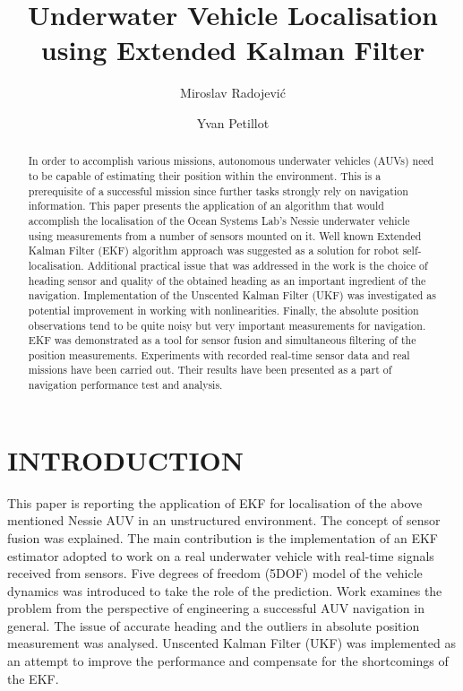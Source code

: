 \documentclass[a4paper, 10pt, conference]{ieeeconf}        %
\title{\LARGE \bf
Underwater Vehicle Localisation using Extended Kalman Filter
}
\author[1]{Miroslav Radojevi\'{c}}
\author[2]{Yvan Petillot}
\affil[1]{Erasmus Mundus Master in Computer Vision and Robotics (ViBot) student}
\affil[2]{Ocean Systems Laboratory, Heriot-Watt University, Edinburgh, UK}
\begin{document}
\maketitle
\thispagestyle{empty}
\pagestyle{empty}

\let\oldthefootnote\thefootnote
\renewcommand{\thefootnote}{\fnsymbol{footnote}}
\let\thefootnote\oldthefootnote


\renewcommand{\topfraction}{0.85}
\renewcommand{\textfraction}{0.1}
\renewcommand{\floatpagefraction}{0.75}
\begin{abstract}
In order to accomplish various missions, autonomous underwater vehicles (AUVs) need to be capable of estimating their position within the environment. This is a prerequisite of a successful mission since further tasks strongly rely on navigation information. This paper presents the application of an algorithm that would accomplish the localisation of the Ocean Systems Lab's Nessie underwater vehicle using measurements from a number of sensors mounted on it. Well known Extended Kalman Filter (EKF) algorithm approach was suggested as a solution for robot self-localisation. Additional practical issue that was addressed in the work is the choice of heading sensor and quality of the obtained heading as an important ingredient of the navigation. Implementation of the Unscented Kalman Filter (UKF) was investigated as potential improvement in working with nonlinearities. Finally, the absolute position observations tend to be quite noisy but very important measurements for navigation. EKF was demonstrated as a tool for sensor fusion and simultaneous filtering of the position measurements. Experiments with recorded real-time sensor data and real missions have been carried out. Their results have been presented as a part of navigation performance test and analysis. 
\end{abstract}
\section{INTRODUCTION} \label{sec:intro}
This paper is reporting the application of EKF for localisation of the above mentioned Nessie AUV in an unstructured environment. The concept of sensor fusion was explained. The main contribution is the implementation of an EKF estimator adopted to work on a real underwater vehicle with real-time signals received from sensors. Five degrees of freedom (5DOF) model of the vehicle dynamics was introduced to take the role of the prediction. Work examines the problem from the perspective of engineering a successful AUV navigation in general. The issue of accurate heading and the outliers in absolute position measurement was analysed. Unscented Kalman Filter (UKF) \cite{julier96} was implemented as an attempt to improve the performance and compensate for the shortcomings of the EKF.  
\end{document}
